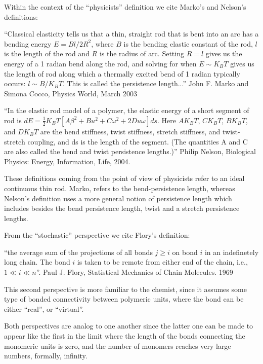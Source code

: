 Within the context of the ``physicists'' definition we cite Marko's
and Nelson's definitions:

``Classical elasticity tells us that a thin, straight rod that is bent
into an arc has a bending energy $E=Bl/2R^2$, where $B$ is the bending
elastic constant of the  rod, $l$ is the length of the  rod and $R$ is
the radius  of arc. Setting  $R=l$ gives us  the energy of a  1 radian
bend along the rod, and solving  for when $E \sim K_{B}T$ gives us the
length  of  rod along  which  a thermally  excited  bend  of 1  radian
typically occurs:  $l \sim B/K_{B}T$.  This is  called the persistence
length...'' John F. Marko and Simona Cocco, Physics World, March 2003

``In the elastic rod model of a polymer, the elastic energy of a short
segment       of       rod       is       $dE=\frac{1}{2}       K_{B}T
[A\beta^2+Bu^2+C\omega^2+2Du\omega]  ds$.  Here  $AK_{B}T$, $CK_{B}T$,
$BK_{B}T$,  and $DK_{B}T$  are  the bend  stiffness, twist  stiffness,
stretch stiffness, and twist-stretch coupling, and ds is the length of
the segment.   (The quantities A  and C are  also called the  bend and
twist  persistence  lengths.)''   Philip Nelson,  Biological  Physics:
Energy, Information, Life, 2004.

These definitions coming from the point of view of physicists refer to
an ideal  continuous thin rod.  Marko, refers  to the bend-persistence
length,  whereas Nelson's  definition uses  a more  general  notion of
persistence length which includes besides the bend persistence length,
twist and a stretch persistence lengths.

From the ``stochastic'' perspective we cite Flory's definition:

``the average sum of  the projections of all bonds $ j  \geq i$ on bond
$i$ in an indefinetely long chain.  The bond $i$ is taken to be remote
from either end of  the chain, i.e., $1 \ll i \ll  n$''. Paul J. Flory,
Statistical Mechanics of Chain Molecules. 1969

This  second perspective  is more  familiar to  the chemist,  since it
assumes  some type  of  bonded connectivity  between polymeric  units,
where the bond can be either ``real'', or ``virtual''.

Both perspectives are  analog to one another since  the latter one can
be made to appear like the first in the limit where the length of
the bonds  connecting the monomeric units  is zero, and  the number of
monomers reaches very large numbers, formally, infinity.


